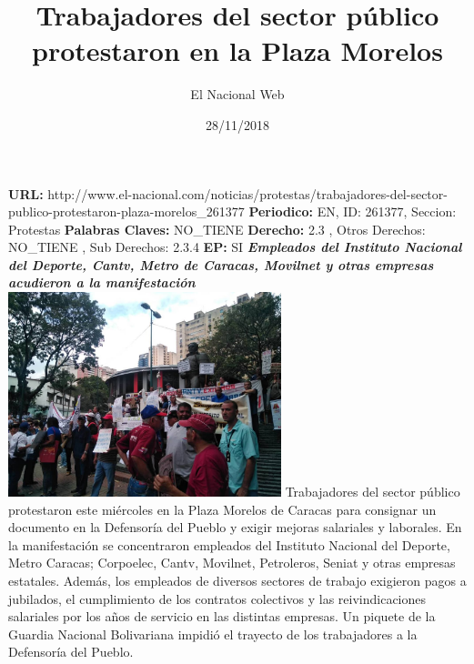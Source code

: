 \documentclass{article}%
\title{\textbf{Trabajadores del sector público protestaron en la Plaza Morelos}}%
\author{El Nacional Web}%
\date{28/11/2018}%
\begin{document}
%
\normalsize%
\maketitle%
\textbf{URL: }%
http://www.el{-}nacional.com/noticias/protestas/trabajadores{-}del{-}sector{-}publico{-}protestaron{-}plaza{-}morelos\_261377\newline%
%
\textbf{Periodico: }%
EN, %
ID: %
261377, %
Seccion: %
Protestas\newline%
%
\textbf{Palabras Claves: }%
NO\_TIENE\newline%
%
\textbf{Derecho: }%
2.3%
, Otros Derechos: %
NO\_TIENE%
, Sub Derechos: %
2.3.4%
\newline%
%
\textbf{EP: }%
SI\newline%
\newline%
%
\textbf{\textit{Empleados del Instituto Nacional del Deporte, Cantv, Metro de Caracas, Movilnet y otras empresas acudieron a la manifestación~}}%
\newline%
\newline%
%
\includegraphics[width=300px]{194.jpg}%
\newline%
%
Trabajadores del sector público protestaron este miércoles en la Plaza Morelos de Caracas para consignar un documento en la Defensoría del Pueblo y exigir mejoras salariales y laborales.%
\newline%
%
En la manifestación se concentraron empleados del Instituto Nacional del Deporte, Metro Caracas; Corpoelec, Cantv, Movilnet, Petroleros, Seniat y otras empresas estatales.%
\newline%
%
Además, los empleados de diversos sectores de trabajo exigieron pagos a jubilados, el cumplimiento de los contratos colectivos y las reivindicaciones salariales por los años de servicio en las distintas empresas.%
\newline%
%
Un piquete de la Guardia Nacional Bolivariana impidió el trayecto de los trabajadores a la Defensoría del Pueblo.%
\newline%
%
\end{document}
